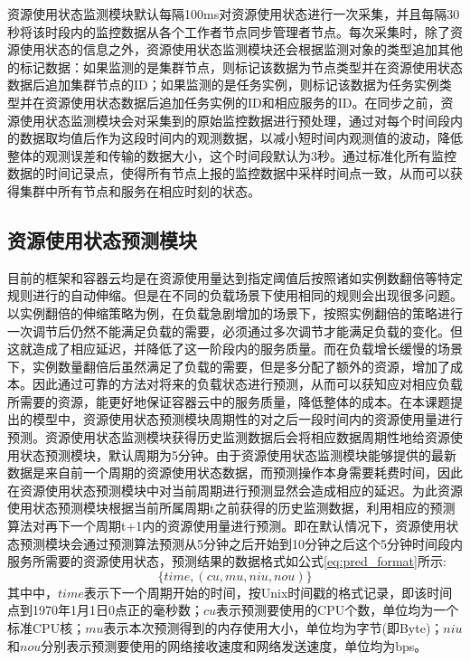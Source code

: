 资源使用状态监测模块默认每隔100ms对资源使用状态进行一次采集，并且每隔30秒将该时段内的监控数据从各个工作者节点同步管理者节点。每次采集时，除了资源使用状态的信息之外，资源使用状态监测模块还会根据监测对象的类型追加其他的标记数据：如果监测的是集群节点，则标记该数据为节点类型并在资源使用状态数据后追加集群节点的ID；如果监测的是任务实例，则标记该数据为任务实例类型并在资源使用状态数据后追加任务实例的ID和相应服务的ID。在同步之前，资源使用状态监测模块会对采集到的原始监控数据进行预处理，通过对每个时间段内的数据取均值后作为这段时间内的观测数据，以减小短时间内观测值的波动，降低整体的观测误差和传输的数据大小，这个时间段默认为3秒。通过标准化所有监控数据的时间记录点，使得所有节点上报的监控数据中采样时间点一致，从而可以获得集群中所有节点和服务在相应时刻的状态。

\subsection{资源使用状态预测模块}\label{sec:prediction}
目前的框架和容器云均是在资源使用量达到指定阈值后按照诸如实例数翻倍等特定规则进行的自动伸缩。但是在不同的负载场景下使用相同的规则会出现很多问题。以实例翻倍的伸缩策略为例，在负载急剧增加的场景下，按照实例翻倍的策略进行一次调节后仍然不能满足负载的需要，必须通过多次调节才能满足负载的变化。但这就造成了相应延迟，并降低了这一阶段内的服务质量。而在负载增长缓慢的场景下，实例数量翻倍后虽然满足了负载的需要，但是多分配了额外的资源，增加了成本。因此通过可靠的方法对将来的负载状态进行预测，从而可以获知应对相应负载所需要的资源，能更好地保证容器云中的服务质量，降低整体的成本。在本课题提出的模型中，资源使用状态预测模块周期性的对之后一段时间内的资源使用量进行预测。资源使用状态监测模块获得历史监测数据后会将相应数据周期性地给资源使用状态预测模块，默认周期为5分钟。由于资源使用状态监测模块能够提供的最新数据是来自前一个周期的资源使用状态数据，而预测操作本身需要耗费时间，因此在资源使用状态预测模块中对当前周期进行预测显然会造成相应的延迟。为此资源使用状态预测模块根据当前所属周期t之前获得的历史监测数据，利用相应的预测算法对再下一个周期t+1内的资源使用量进行预测。即在默认情况下，资源使用状态预测模块会通过预测算法预测从5分钟之后开始到10分钟之后这个5分钟时间段内服务所需要的资源使用状态，预测结果的数据格式如公式\ref{eq:pred_format}所示:
\begin{equation}\label{eq:pred_format}
\{time, (cu, mu, niu, nou)\}
\end{equation}
其中中，$time$表示下一个周期开始的时间，按Unix时间戳的格式记录，即该时间点到1970年1月1日0点正的毫秒数；$cu$表示预测要使用的CPU个数，单位均为一个标准CPU核；$mu$表示本次预测得到的内存使用大小，单位均为字节(即Byte)；$niu$和$nou$分别表示预测要使用的网络接收速度和网络发送速度，单位均为bps。


